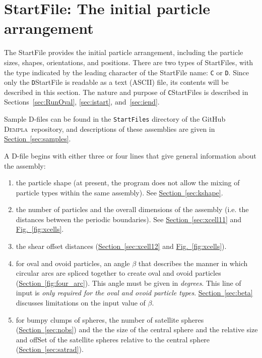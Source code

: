\documentclass[letterpaper,11pt]{article}
\newcommand{\Dempla}{\textsc{Dempla}}
\begin{document}
\section{\textsf{StartFile}: The initial particle arrangement}%
\label{sec:startfileD}
The \textsf{StartFile} provides the initial particle arrangement,
including the
particle sizes, shapes, orientations, and positions.
There are two types of \textsf{StartFiles}, with the type indicated by
the leading character of the \textsf{StartFile} name:
\texttt{C} or \texttt{D}.
Since only the \texttt{D}\textsf{StartFile} is readable as a
text (ASCII) file, its contents will be described in this section.
The nature and
purpose of \texttt{C}\textsf{StartFile}s is described in
Sections~\ref{sec:RunOval}, \ref{sec:istart}, and~\ref{sec:iend}.
\par
Sample D-files can be found in the \texttt{StartFiles} directory
of the GitHub \Dempla\ repository,
and descriptions of these assemblies
are given in \hyperref[sec:samples]{Section~\ref*{sec:samples}}.
\par
A D-file begins with either three or four lines that give general
information about the assembly:
\begin{enumerate}
\item
the particle shape (at present, the program does not allow the mixing
of particle types within the same assembly).
See \hyperref[sec:kshape]{Section~\ref*{sec:kshape}}.
%
\item
the number of particles and the overall dimensions of the assembly
(i.e. the distances between the periodic boundaries).
See \hyperref[sec:xcell11]{Section~\ref*{sec:xcell11}}
and \hyperref[fig:xcells]{Fig.~\ref*{fig:xcells}}.
%
\item
the shear offset distances 
(\hyperref[sec:xcell12]{Section~\ref*{sec:xcell12}}
and \hyperref[fig:xcells]{Fig.~\ref*{fig:xcells}}).
%
\item
for oval and ovoid particles,
an angle $\beta$ that describes the manner in which circular arcs are spliced
together to create oval and ovoid particles
(\hyperref[fig:four_arc]{Section~\ref*{fig:four_arc}}).
This angle must be given in \emph{degrees}.
This line of input is 
\emph{only required for the oval and ovoid particle types}.
\hyperref[sec:beta]{Section~\ref*{sec:beta}}
discusses limitations on the input value of $\beta$.
%
\item
for bumpy clumps of spheres, the number of satellite spheres
(\hyperref[sec:nobs]{Section~\ref*{sec:nobs}}) and the
the size of the central sphere and the relative size and offSet
of the satellite spheres relative to the central sphere
(\hyperref[sec:satrad]{Section~\ref*{sec:satrad}}).
%
\end{enumerate}
\end{document}
